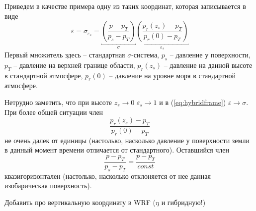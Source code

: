 Приведем в качестве примера одну из таких координат, которая записывается в виде
    \begin{equation}
    \label{eq:hybridframe}
        \varepsilon= \sigma_{\varepsilon_s} =
        \underbracket{\left( \frac{p-p_T}{p_s-p_T} \right)}_{\sigma}
        \underbracket{\left( \frac{p_r(z_s) - p_T}{p_r(0) - p_T} \right)}_{\varepsilon_s}
    \end{equation}
Первый множитель здесь -- стандартная $\sigma$-система, $p_s$ -- давление у поверхности, $p_T$ -- давление на верхней границе области, $p_r(z_s)$ -- давление на данной высоте в стандартной атмосфере, $p_r(0)$ -- давление на уровне моря в стандартной атмосфере. 

Нетрудно заметить, что при высоте $z_s\rightarrow0$ $\varepsilon_s\rightarrow1$ и в (\ref{eq:hybridframe}) $\varepsilon\rightarrow\sigma$. При более общей ситуации член 
    \begin{equation*}
         \frac{p_r(z_s) - p_T}{p_r(0) - p_T} 
    \end{equation*}
не очень далек от единицы (настолько, насколько давление у поверхности земли в данный момент времени отличается от стандартного). Оставшийся член 
    \begin{equation*}
         \frac{p-p_T}{p_s-p_T}=\frac{p-p_T}{const} 
    \end{equation*}
квазигоризонтален (настолько, насколько отклоняется от нее данная изобарическая поверхность).

   \begin{warn}
        Добавить про вертикальную координату в WRF ($\eta$ и гибридную!) 
   \end{warn}
